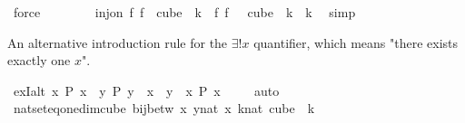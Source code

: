 \begin{isabellebody}
\ force\isanewline
\ \ \isacommand{{\isacharbraceright}{\kern0pt}}\isamarkupfalse%
\isanewline
\ \ \isamarkupfalse%
\ \isamarkupfalse%
\ {\isachardoublequoteopen}inj{\isacharunderscore}{\kern0pt}on\ {\isacharparenleft}{\kern0pt}{\isasymlambda}f{\isachardot}{\kern0pt}\ f\ {}{\isacharparenright}{\kern0pt}\ {\isacharparenleft}{\kern0pt}cube\ {}\ k{\isacharparenright}{\kern0pt}\ {\isasymand}\ {\isacharparenleft}{\kern0pt}{\isasymlambda}f{\isachardot}{\kern0pt}\ f\ {}{\isacharparenright}{\kern0pt}\ {\isacharbackquote}{\kern0pt}\ cube\ {}\ k\ {\isacharequal}{\kern0pt}\ {\isacharbraceleft}{\kern0pt}{\isachardot}{\kern0pt}{\isachardot}{\kern0pt}{\isacharless}{\kern0pt}k{\isacharbraceright}{\kern0pt}{\isachardoublequoteclose}\ \isamarkupfalse%
\ simp\isanewline
{}\isamarkupfalse%
%
\endisatagproof
{\isafoldproof}%
%
\isadelimproof
%
\endisadelimproof
%
\begin{isamarkuptext}%
An alternative introduction rule for the $\exists!x$ quantifier, which means "there exists exactly one $x$".%
\end{isamarkuptext}\isamarkuptrue%
\isamarkupfalse%
\ ex{}I{\isacharunderscore}{\kern0pt}alt{\isacharcolon}{\kern0pt}\ {\isachardoublequoteopen}{\isacharparenleft}{\kern0pt}{\isasymexists}x{\isachardot}{\kern0pt}\ P\ x\ {\isasymand}\ {\isacharparenleft}{\kern0pt}{\isasymforall}y{\isachardot}{\kern0pt}\ P\ y\ {\isasymlongrightarrow}\ x\ {\isacharequal}{\kern0pt}\ y{\isacharparenright}{\kern0pt}{\isacharparenright}{\kern0pt}\ {\isasymLongrightarrow}\ {\isacharparenleft}{\kern0pt}{\isasymexists}{\isacharbang}{\kern0pt}x{\isachardot}{\kern0pt}\ P\ x{\isacharparenright}{\kern0pt}{\isachardoublequoteclose}\ \isanewline
%
\isadelimproof
\ \ %
\endisadelimproof
%
\isatagproof
{}\isamarkupfalse%
\ auto%
\endisatagproof
{\isafoldproof}%
%
\isadelimproof
\isanewline
%
\endisadelimproof
{}\isamarkupfalse%
\ nat{\isacharunderscore}{\kern0pt}set{\isacharunderscore}{\kern0pt}eq{\isacharunderscore}{\kern0pt}one{\isacharunderscore}{\kern0pt}dim{\isacharunderscore}{\kern0pt}cube{\isacharcolon}{\kern0pt}\ {\isachardoublequoteopen}bij{\isacharunderscore}{\kern0pt}betw\ {\isacharparenleft}{\kern0pt}{\isasymlambda}x{\isachardot}{\kern0pt}\ {\isasymlambda}y{\isasymin}{\isacharbraceleft}{\kern0pt}{\isachardot}{\kern0pt}{\isachardot}{\kern0pt}{\isacharless}{\kern0pt}{}{\isacharcolon}{\kern0pt}{\isacharcolon}{\kern0pt}nat{\isacharbraceright}{\kern0pt}{\isachardot}{\kern0pt}\ x{\isacharparenright}{\kern0pt}\ {\isacharbraceleft}{\kern0pt}{\isachardot}{\kern0pt}{\isachardot}{\kern0pt}{\isacharless}{\kern0pt}k{\isacharcolon}{\kern0pt}{\isacharcolon}{\kern0pt}nat{\isacharbraceright}{\kern0pt}\ {\isacharparenleft}{\kern0pt}cube\ {}\ k{\isacharparenright}{\kern0pt}{\isachardoublequoteclose}\isanewline

\end{isabellebody}
